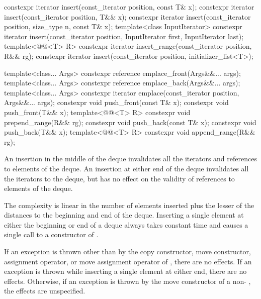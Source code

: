 %
%
%
%
\begin{itemdecl}
constexpr iterator insert(const_iterator position, const T& x);
constexpr iterator insert(const_iterator position, T&& x);
constexpr iterator insert(const_iterator position, size_type n, const T& x);
template<class InputIterator>
  constexpr iterator insert(const_iterator position,
                            InputIterator first, InputIterator last);
template<@@<T> R>
  constexpr iterator insert_range(const_iterator position, R&& rg);
constexpr iterator insert(const_iterator position, initializer_list<T>);

template<class... Args> constexpr reference emplace_front(Args&&... args);
template<class... Args> constexpr reference emplace_back(Args&&... args);
template<class... Args> constexpr iterator emplace(const_iterator position, Args&&... args);
constexpr void push_front(const T& x);
constexpr void push_front(T&& x);
template<@@<T> R>
  constexpr void prepend_range(R&& rg);
constexpr void push_back(const T& x);
constexpr void push_back(T&& x);
template<@@<T> R>
  constexpr void append_range(R&& rg);
\end{itemdecl}

\begin{itemdescr}
\pnum
\effects
An insertion in the middle of the deque invalidates all the iterators and
references to elements of the deque.
An insertion at either end of the
deque invalidates all the iterators to the deque, but has no effect on
the validity of references to elements of the deque.

\pnum
\complexity
The complexity is linear in the number of elements inserted plus the lesser
of the distances to the beginning and end of the deque.
Inserting a single element at either the beginning or end of a deque always takes constant time
and causes a single call to a constructor of
.

\pnum
\remarks
If an exception is thrown other than by the
copy constructor, move constructor,
assignment operator, or move assignment operator of
,
there are no effects.
If an exception is thrown while inserting a single element at either end,
there are no effects.
Otherwise, if an exception is thrown by the move constructor of a
non-
, the effects are unspecified.
\end{itemdescr}

